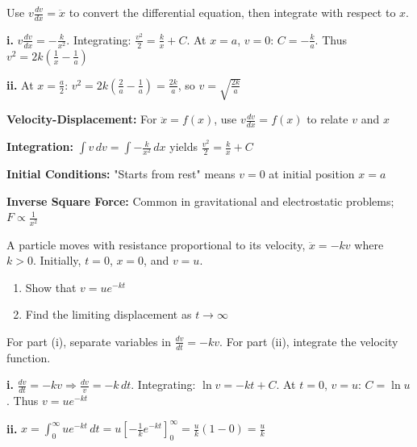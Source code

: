 \begin{hint}
Use $v\frac{dv}{dx} = \ddot{x}$ to convert the differential equation, then integrate with respect to $x$.
\end{hint}

\begin{solution}
\textbf{i.} $v\frac{dv}{dx} = -\frac{k}{x^2}$. Integrating: $\frac{v^2}{2} = \frac{k}{x} + C$. At $x = a$, $v = 0$: $C = -\frac{k}{a}$. Thus $v^2 = 2k\left(\frac{1}{x} - \frac{1}{a}\right)$

\textbf{ii.} At $x = \frac{a}{2}$: $v^2 = 2k\left(\frac{2}{a} - \frac{1}{a}\right) = \frac{2k}{a}$, so $v = \sqrt{\frac{2k}{a}}$
\end{solution}

\begin{takeaways}
\item \textbf{Velocity-Displacement:} For $\ddot{x} = f(x)$, use $v\frac{dv}{dx} = f(x)$ to relate $v$ and $x$
\item \textbf{Integration:} $\int v\,dv = \int -\frac{k}{x^2}\,dx$ yields $\frac{v^2}{2} = \frac{k}{x} + C$
\item \textbf{Initial Conditions:} "Starts from rest" means $v = 0$ at initial position $x = a$
\item \textbf{Inverse Square Force:} Common in gravitational and electrostatic problems; $F \propto \frac{1}{x^2}$
\end{takeaways}

\begin{problem}
A particle moves with resistance proportional to its velocity, $\ddot{x} = -kv$ where $k > 0$. Initially, $t = 0$, $x = 0$, and $v = u$.

\begin{enumerate}[label=\textbf{\roman*.}]
    \item Show that $v = ue^{-kt}$
    \item Find the limiting displacement as $t \to \infty$
\end{enumerate}
\end{problem}

\begin{hint}
For part (i), separate variables in $\frac{dv}{dt} = -kv$. For part (ii), integrate the velocity function.
\end{hint}

\begin{solution}
\textbf{i.} $\frac{dv}{dt} = -kv \Rightarrow \frac{dv}{v} = -k\,dt$. Integrating: $\ln v = -kt + C$. At $t=0$, $v=u$: $C = \ln u$. Thus $v = ue^{-kt}$

\textbf{ii.} $x = \int_0^\infty ue^{-kt}\,dt = u\left[-\frac{1}{k}e^{-kt}\right]_0^\infty = \frac{u}{k}(1 - 0) = \frac{u}{k}$
\end{solution}

